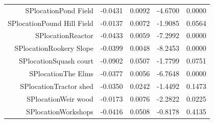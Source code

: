 \begin{table}[ht]
\begin{tabular}{rrrrr}
$$  SPlocationPond Field & -0.0431 & 0.0092 & -4.6700 & 0.0000 \\ 
  SPlocationPound Hill Field & -0.0137 & 0.0072 & -1.9085 & 0.0564 \\ 
  SPlocationReactor & -0.0433 & 0.0059 & -7.2992 & 0.0000 \\ 
  SPlocationRookery Slope & -0.0399 & 0.0048 & -8.2453 & 0.0000 \\ 
  SPlocationSquash court & -0.0902 & 0.0507 & -1.7799 & 0.0751 \\ 
  SPlocationThe Elms & -0.0377 & 0.0056 & -6.7648 & 0.0000 \\ 
  SPlocationTractor shed & -0.0350 & 0.0242 & -1.4492 & 0.1473 \\ 
  SPlocationWeir wood & -0.0173 & 0.0076 & -2.2822 & 0.0225 \\ 
  SPlocationWorkshops & -0.0416 & 0.0508 & -0.8178 & 0.4135 \\ 
   \hline
\end{tabular}
\end{table}
